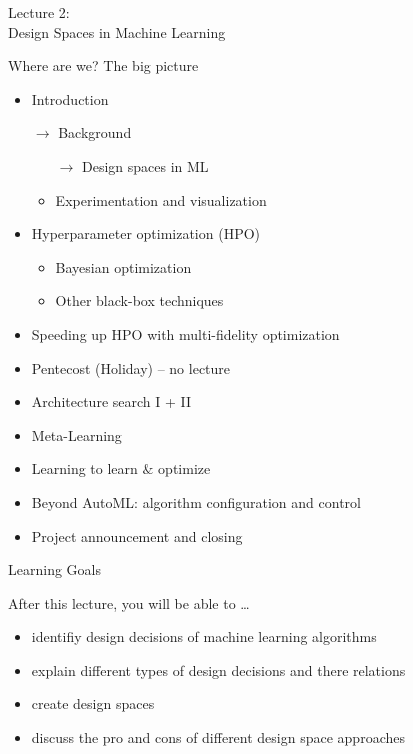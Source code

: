 \begin{frame}[c]{}

\centering
\huge
Lecture 2:\\
Design Spaces in Machine Learning
\end{frame}
\begin{frame}[c]{Where are we? The big picture}

\begin{itemize}
	\item Introduction
	\item[$\to$] Background
	\begin{itemize}
		\item[$\to$] Design spaces in ML
		\item Experimentation and visualization
	\end{itemize}
	\item Hyperparameter optimization (HPO)
	\begin{itemize}
	  \item Bayesian optimization
	  \item Other black-box techniques
	\end{itemize}
	\item Speeding up HPO with multi-fidelity optimization
	\item Pentecost (Holiday) -- no lecture
	\item Architecture search I + II
	\item Meta-Learning
	\item Learning to learn $\&$ optimize
	\item Beyond AutoML: algorithm configuration and control
	\item Project announcement and closing
\end{itemize}


\end{frame}
\begin{frame}[c]{Learning Goals}

After this lecture, you will be able to \ldots

\begin{itemize}
  \item identifiy design decisions of machine learning algorithms
  \item explain different types of design decisions and there relations
  \item create design spaces
  \item discuss the pro and cons of different design space approaches
\end{itemize}

\end{frame}
